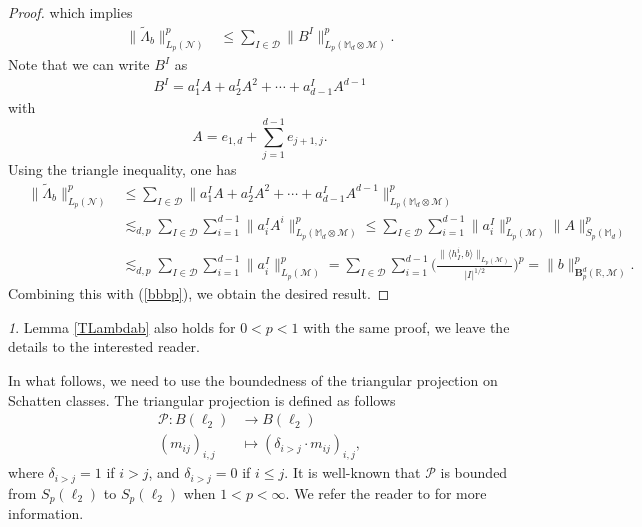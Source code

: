 \documentclass[oneside,english,a4wide]{amsart}
\numberwithin{equation}{section}
\numberwithin{figure}{section}
\theoremstyle{plain}
\theoremstyle{plain}
\theoremstyle{definition}
\theoremstyle{plain}
\theoremstyle{remark}
\newtheorem{rem}[thm]{\protect\remarkname}
\theoremstyle{definition}
\theoremstyle{remark}
\theoremstyle{definition}
\providecommand{\remarkname}{Remark}
\newcommand{\8}{\infty}
\begin{document}
\begin{proof}
	which implies
	\begin{equation*}
		\begin{aligned}
			\|\tilde{\varLambda}_b\|_{L_p(\mathcal{N})}^p{}&\le \sum_{I\in\mathcal{D}}\|B^I\|_{L_p(\mathbb{M}_{d}\otimes\mathcal{M})}^p.
		\end{aligned}
	\end{equation*}
	Note that we can write $B^I$ as
	\begin{equation*}
		\begin{aligned}
			B^I=a_1^IA+a_2^IA^2+\cdots+a_{d-1}^IA^{d-1}
		\end{aligned}
	\end{equation*}
	with
	\begin{equation*}
		A=e_{1,d}+\sum_{j=1}^{d-1}e_{j+1,j}.
	\end{equation*}
	Using the triangle inequality, one has
	\begin{equation*}\label{bbbbp}
		\begin{aligned}
			\quad\|\tilde{\varLambda}_b\|_{L_p(\mathcal{N})}^p{}&\le \sum_{I\in\mathcal{D}}\|a_1^IA+a_2^IA^2+\cdots+a_{d-1}^IA^{d-1}\|_{L_p(\mathbb{M}_{d}\otimes\mathcal{M})}^p\\&\lesssim_{d,p}\sum_{I\in\mathcal{D}}\sum_{i=1}^{d-1}\|a_i^IA^i\|^p_{L_p(\mathbb{M}_{d}\otimes\mathcal{M})}\le\sum_{I\in\mathcal{D}}\sum_{i=1}^{d-1}\|a_i^I\|_{L_p(\mathcal{M})}^p\|A\|^p_{S_p(\mathbb{M}_{d})}\\&\lesssim_{d,p}\sum_{I\in\mathcal{D}}\sum_{i=1}^{d-1}\|a_i^I\|_{L_p(\mathcal{M})}^p=\sum_{I\in \mathcal{D}}\sum_{i=1}^{d-1}\biggl(\frac{\|\langle h_I^i,b\rangle\|_{L_p(\mathcal{M})}}{|I|^{1/2}}\biggr)^p=\|b\|_{\pmb{B}_p^{d}(\mathbb{R},\mathcal{M})}^p.
		\end{aligned}
	\end{equation*}
	Combining this with (\ref{bbbp}), we obtain the desired result.
\end{proof}
\begin{rem}
	Lemma \ref{TLambdab} also holds for $0<p<1$ with the same proof,  we leave the details to the interested reader.
\end{rem}

In what follows, we need to use the boundedness of  the triangular projection on Schatten classes. The triangular projection is defined as follows
\begin{equation*}
	\begin{aligned}
		\mathcal{P}: B(\ell_2{}) &\longrightarrow B(\ell_2) \\
		(m_{ij})_{i,j}&\longmapsto (\delta_{i>j}\cdot m_{ij})_{i,j},
	\end{aligned}
\end{equation*}
where $\delta_{i>j}=1$ if $i>j$, and $\delta_{i>j}=0$ if $i\leq j$. It is well-known that $\mathcal{P}$ is bounded from $S_p(\ell_2)$ to $S_p(\ell_2)$ when $1<p<\8$. We refer the reader to \cite{GK} for more information.
\end{document}
